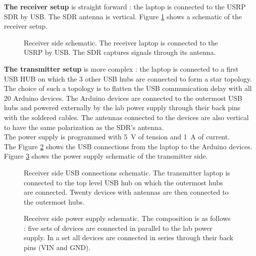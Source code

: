 \documentclass[a4paper, 12pt]{article}
\begin{document}
\textbf{The receiver setup} is straight forward : the laptop is connected to the USRP SDR by USB. The SDR antenna is vertical. Figure \ref{fig:receiverSheme} shows a schematic of the receiver setup.

\begin{figure}[ht]
  \begin{center}
    
  \end{center}
  \caption{Receiver side schematic. The receiver laptop is connected to the USRP by USB. The SDR captures signals through its antenna.}\label{fig:receiverSheme}
\end{figure}


\newpage
\textbf{The transmitter setup} is more complex :
the laptop is connected to a first USB HUB on which the 3 other USB hubs are connected to form a star topology. The choice of such a topology is to flatten the USB communication delay with all 20 Arduino devices.
The Arduino devices are connected to the outermost USB hubs and powered externally by the lab power supply through their back pins with the soldered cables. The antennas connected to the devices are also vertical to have the same polarization as the SDR's antenna.\\
The power supply is programmed with \qty{5}{\volt} of tension and \qty{1}{\ampere} of current.\\  
The Figure \ref{fig:transConn} shows the USB connections from the laptop to the Arduino devices.
Figure \ref{fig:transPower} shows the power supply schematic of the transmitter side. 




\begin{figure}[H]
  \begin{center}
    
  \end{center}
  \caption{Receiver side USB connections schematic. The transmitter laptop is connected to the top level USB hub on which the outermost hubs are connected. Twenty devices with antennas are then connected to the outermost hubs.}\label{fig:transConn}
\end{figure}

\begin{figure}[ht]
  \begin{center}
    
  \end{center}
  \caption{Receiver side power supply schematic. The composition is as follows : five sets of devices are connected in parallel to the lab power supply. In a set all devices are connected in series through their back pins (VIN and GND).}\label{fig:transPower}
\end{figure}
\end{document}
